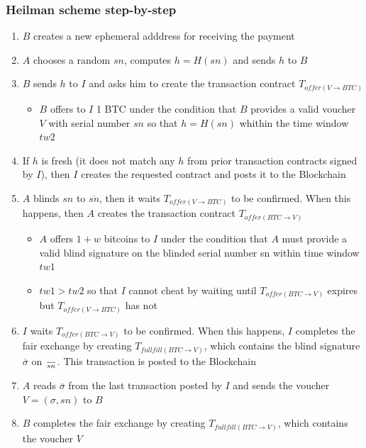 \subsubsection{Heilman scheme step-by-step}
\begin{enumerate}
          \item $B$ creates a new ephemeral adddress for receiving the payment
          \item $A$ chooses a random $sn$, computes $h=H(sn)$ and sends $h$ to $B$
          \item $B$ sends $h$ to $I$ and asks him to create the transaction contract $T_{offer(V\rightarrow BTC)}$
          \begin{itemize}
              \item $B$ offers to $I$ 1 BTC under the condition that $B$ provides a valid voucher $V$ with serial number $sn$ so that $h=H(sn)$ whithin the time window $tw2$
          \end{itemize}
          \item If $h$ is fresh (it does not match any $h$ from prior transaction contracts signed by $I$), then $I$ creates the requested contract and posts it to the Blockchain
          \item $A$ blinds $sn$ to $\overline{sn}$, then it waits $T_{offer(V\rightarrow BTC)}$ to be confirmed. When this happens, then $A$ creates the transaction contract $T_{offer(BTC\rightarrow V)}$
          \begin{itemize}
              \item $A$ offers $1 + w$ bitcoins to $I$ under the condition that $A$ must provide a valid blind signature on the blinded serial number sn within time window $tw1$
              \item $tw1 > tw2$ so that $I$ cannot cheat by waiting until $T_{offer(BTC\rightarrow V)}$ expires but $T_{offer(V\rightarrow BTC)}$ has not
          \end{itemize}
          \item $I$ waits $T_{offer(BTC\rightarrow V)}$ to be confirmed. When this happens, $I$ completes the fair exchange by creating $T_{fullfill(BTC\rightarrow V)}$, which contains the blind signature $\overline{\sigma}$ on $\over{sn}$. This transaction is posted to the Blockchain
          \item $A$ reads $\overline{\sigma}$ from the last transaction posted by $I$ and sends the voucher $V=(\sigma,sn)$ to $B$
          \item $B$ completes the fair exchange by creating $T_{fullfill(BTC\rightarrow V)}$, which contains the voucher $V$ 
\end{enumerate}

